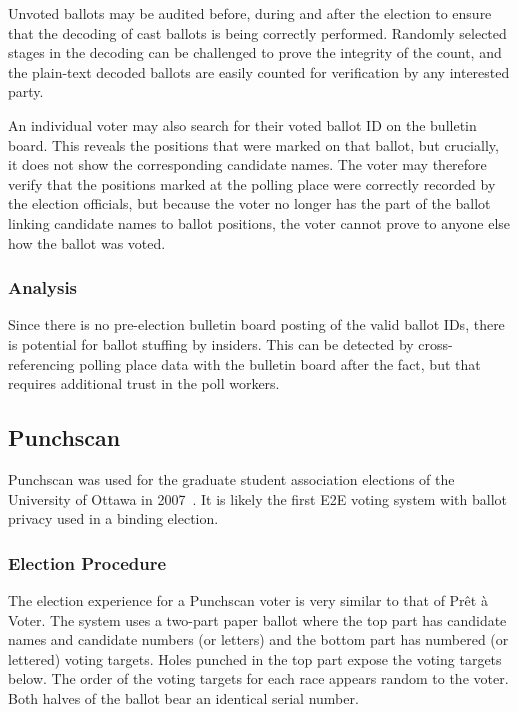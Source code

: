 Unvoted ballots may be audited before, during and after the election
to ensure that the decoding of cast ballots is being correctly
performed. Randomly selected stages in the decoding can be challenged
to prove the integrity of the count, and the plain-text decoded
ballots are easily counted for verification by any interested party.

An individual voter may also search for their voted ballot ID on the
bulletin board. This reveals the positions that were marked on that
ballot, but crucially, it does not show the corresponding candidate
names. The voter may therefore verify that the positions marked at the
polling place were correctly recorded by the election officials, but
because the voter no longer has the part of the ballot linking
candidate names to ballot positions, the voter cannot prove to anyone
else how the ballot was voted.

\subsubsection{Analysis}

Since there is no pre-election bulletin board posting of the valid
ballot IDs, there is potential for ballot stuffing by
insiders. This can be detected by cross-referencing polling place
data with the bulletin board after the fact, but that requires
additional trust in the poll workers.

\subsection{Punchscan~\cite{popoveniuc2006,popoveniuc2010punchscan}}
\label{sec:punchscan}

Punchscan was used for the graduate student association elections of
the University of Ottawa in 2007~\cite{essex2007}. It is likely
the first E2E voting system with ballot privacy used in a binding
election.

\subsubsection{Election Procedure}

The election experience for a Punchscan voter is very similar to that
of Prêt à Voter. The system uses a two-part paper ballot where the top
part has candidate names and candidate numbers (or letters) and the
bottom part has numbered (or lettered) voting targets. Holes punched
in the top part expose the voting targets below. The order of the
voting targets for each race appears random to the voter. Both halves
of the ballot bear an identical serial number.

